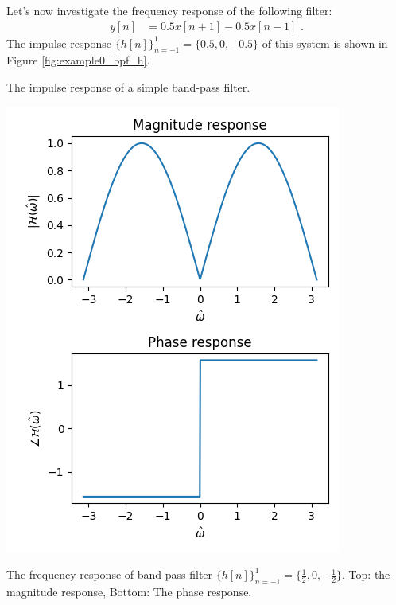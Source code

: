 Let's now investigate the frequency response of the following filter:
\begin{align}
y[n] & = 0.5 x[n+1] - 0.5 x[n-1] \,\,.
\end{align}
The impulse response  $\{h[n]\}_{n=-1}^{1}=\{0.5,0,-0.5\}$ of this system is shown in Figure \ref{fig:example0_bpf_h}.
\begin{marginfigure}
\begin{center}
\end{center}
\caption{The impulse response of a simple band-pass filter.}
\label{fig:example0_bpf_h}
\end{marginfigure}

\begin{marginfigure}
\begin{center}
\includegraphics[width=\textwidth]{code/019_frequency_response/bpf_fresp.png}
\end{center}
\caption{The frequency response of band-pass filter $\{h[n]\}_{n=-1}^{1}=\{\frac{1}{2},0,-\frac{1}{2}\}$. Top: the magnitude response, Bottom: The phase response.}
\label{fig:example_bpf_fresp}
\end{marginfigure}

